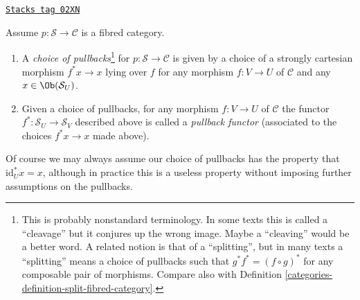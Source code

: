 \begin{definition}
\label{categories-definition-pullback-functor-fibred-category}
\href{https://stacks.math.columbia.edu/tag/02XN}{\texttt{Stacks tag 02XN}}

Assume $p : \mathcal{S} \to \mathcal{C}$ is a fibred category.
\begin{enumerate}
\item A {\it choice of pullbacks}\footnote{This is probably nonstandard
terminology. In some texts this is called a ``cleavage'' but it conjures up
the wrong image. Maybe a ``cleaving'' would be a better word.
A related notion is that of a ``splitting'', but in many texts a ``splitting''
means a choice of pullbacks such that $g^*f^* = (f \circ g)^*$
for any composable pair of morphisms. Compare
also with Definition \ref{categories-definition-split-fibred-category}.}
for $p : \mathcal{S} \to \mathcal{C}$
is given by a choice of a strongly cartesian morphism
$f^\ast x \to x$ lying over $f$ for any morphism
$f: V \to U$ of $\mathcal{C}$ and any $x \in \Ob(\mathcal{S}_U)$.
\item Given a choice of pullbacks,
for any morphism $f : V \to U$ of $\mathcal{C}$
the functor $f^* : \mathcal{S}_U \to \mathcal{S}_V$ described
above is called a {\it pullback functor} (associated to the choices
$f^*x \to x$ made above).
\end{enumerate}
\end{definition}

Of course we may always assume our choice of pullbacks has the property that
$\text{id}_U^*x = x$, although in practice this is a useless property
without imposing further assumptions on the pullbacks.

